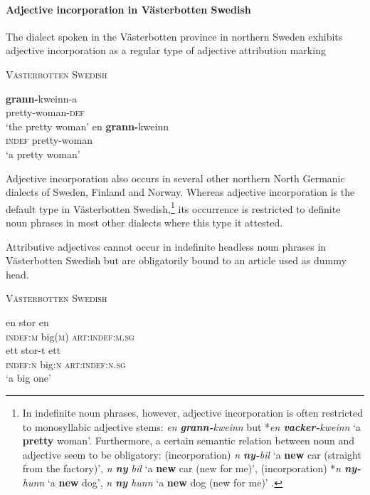 \paragraph{Adjective incorporation in Västerbotten Swedish} \label{bondska synchr}
The dialect spoken in the Västerbotten province in northern Sweden exhibits adjective incorporation as a regular type of adjective attribution marking
\begin{exe}
\ex \textsc{Västerbotten Swedish} \citep[91–92]{holmberg-etal2003}
\begin{xlist}
\ex
\gll 	\textbf{grann-}kweinn-a\\	
	pretty-woman-\textsc{def}\\
\glt	‘the pretty woman’
\ex
\gll	en \textbf{grann-}kweinn\\
	\textsc{indef} pretty-woman\\
\glt	‘a pretty woman’
\end{xlist}
\end{exe}
Adjective incorporation also occurs in several other northern North Germanic dialects of Sweden, Finland and Norway. Whereas adjective incorporation is the default type in Västerbotten Swedish,\footnote{In indefinite noun phrases, however, adjective incorporation is often restricted to monosyllabic adjective stems: \textit{en \textbf{grann-}kweinn} but *\textit{en \textbf{vacker-}kweinn} ‘a \textbf{pretty} woman’. Furthermore, a certain semantic relation between noun and adjective seem to be obligatory: (incorporation) \textit{n \textbf{ny-}bil} ‘a \textbf{new} car (straight from the factory)’, \textit{n \textbf{ny} bil} ‘a \textbf{new} car (new for me)’, (incorporation) *\textit{n \textbf{ny-}hunn} ‘a \textbf{new} dog’, \textit{n \textbf{ny} hunn} ‘a \textbf{new} dog (new for me)’ \cite[91–92]{holmberg-etal2003}.} its occurrence is restricted to definite noun phrases in most other dialects where this type it attested.

Attributive adjectives cannot occur in indefinite headless noun phrases in Västerbotten Swedish but are obligatorily bound to an article used as dummy head.
\begin{exe}
\ex  \textsc{Västerbotten Swedish} \citep{holmberg-etal2003,delsing1996}
\begin{xlist}
\ex
\gll 	en stor en\\	
	\textsc{indef:m} big(\textsc{m}) \textsc{art:indef:m.sg}\\
\ex
\gll 	ett stor-t ett\\	
	\textsc{indef:n} big:\textsc{n} \textsc{art:indef:n.sg}\\
\glt	‘a big one’
\end{xlist}
\end{exe}

